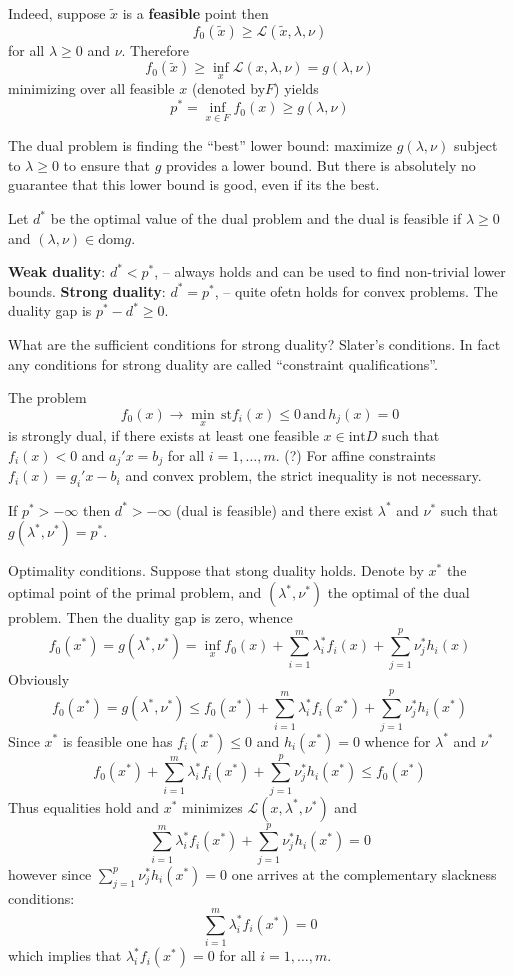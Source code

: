 \documentclass[a4paper]{article}
\newcommand{\Lcal}{\mathcal{L}}
\begin{document}
Indeed, suppose $\tilde{x}$ is a \textbf{feasible} point then
\[ f_0(\tilde{x}) \geq \Lcal(\tilde{x},\lambda,\nu) \]
for all $\lambda\geq0$ and $\nu$. Therefore
\[ f_0(\tilde{x}) \geq \inf_x \Lcal(x,\lambda,\nu) = g(\lambda,\nu)\]
minimizing over all feasible $x$ (denoted by$F$) yields
\[ p^* = \inf_{x\in F} f_0(x) \geq g(\lambda,\nu)\]

The dual problem is finding the ``best'' lower bound: maximize $g(\lambda,\nu)$
subject to $\lambda \geq 0$ to ensure that $g$ provides a lower bound. But there
is absolutely no guarantee that this lower bound is good, even if its the best.

Let $d^*$ be the optimal value of the dual problem and the dual is feasible if
$\lambda\geq 0$ and $(\lambda,\nu)\in\text{dom}g$.

\textbf{Weak duality}: $d^*<p^*$, -- always holds and can be used to find non-trivial
lower bounds.
\textbf{Strong duality}: $d^*=p^*$, -- quite ofetn holds for convex problems.
The duality gap is $p^*-d^*\geq 0$.

What are the sufficient conditions for strong duality? Slater's conditions.
In fact any conditions for strong duality are called ``constraint qualifications''.

The problem 
\[ f_0(x) \to \min_x\,\text{st} f_i(x) \leq 0\,\text{and}\, h_j(x) = 0\]
is strongly dual, if there exists at least one feasible $x\in \text{int}D$
such that $f_i(x) < 0$ and $a_j'x = b_j$ for all $i=1,\ldots,m$. (?) For affine
constraints $f_i(x) = g_i'x - b_i$ and convex problem, the strict inequality is
not necessary.

If $p^*>-\infty$ then $d^*>-\infty$ (dual is feasible) and there exist $\lambda^*$
and $\nu^*$ such that $g(\lambda^*, \nu^*) = p^*$.

Optimality conditions. Suppose that stong duality holds. Denote by $x^*$ the optimal
point of the primal problem, and $(\lambda^*, \nu^*)$ the optimal of the dual problem.
Then the duality gap is zero, whence
\[
f_0(x^*)
= g(\lambda^*,\nu^*)
= \inf_x f_0(x) + \sum_{i=1}^m\lambda_i^* f_i(x) + \sum_{j=1}^p\nu_j^* h_i(x)
\]
Obviously
\[
f_0(x^*)
= g(\lambda^*,\nu^*)
\leq f_0(x^*) + \sum_{i=1}^m\lambda_i^* f_i(x^*) + \sum_{j=1}^p\nu_j^* h_i(x^*)
\]
Since $x^*$ is feasible one has $f_i(x^*)\leq 0$ and $h_i(x^*) = 0$ whence for
$\lambda^*$ and $\nu^*$
\[
f_0(x^*) + \sum_{i=1}^m\lambda_i^* f_i(x^*) + \sum_{j=1}^p\nu_j^* h_i(x^*)
\leq f_0(x^*)
\]
Thus equalities hold and $x^*$ minimizes $\Lcal(x,\lambda^*, \nu^*)$ and
\[
\sum_{i=1}^m\lambda_i^* f_i(x^*) + \sum_{j=1}^p\nu_j^* h_i(x^*) = 0
\]
however since $ \sum_{j=1}^p\nu_j^* h_i(x^*) = 0 $ one arrives at the complementary
slackness conditions:
\[ \sum_{i=1}^m \lambda_i^* f_i(x^*) = 0 \]
which implies that $\lambda_i^* f_i(x^*) = 0$ for all $i=1,\ldots,m$.
\end{document}
